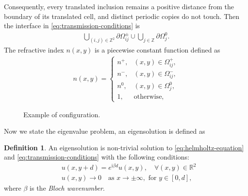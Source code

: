 \documentclass[11pt,fleqn]{article}
\newcommand{\ii}{\mathrm{i}}
\theoremstyle{definition}
\newtheorem{definition}{Definition}
\theoremstyle{remark}
\begin{document}
Consequently, every translated inclusion remains a positive distance from the
boundary of its translated cell, and distinct periodic copies do not touch.
Then the interface in \eqref{eq:transmission-conditions} is \begin{align*}
  \bigcup_{(i,j) \in \mathbb{Z}^2} \partial\Omega^\pm_{ij} \cup
  \bigcup_{j \in \mathbb{Z}} \partial\Omega^0_j.
\end{align*}
The refractive index $n(x, y)$ is a piecewise constant function defined as \begin{align}
  n(x,y) = \begin{cases}
    n^+, & (x,y) \in \Omega^+_{ij},\\
    n^-, & (x,y) \in \Omega^-_{ij},\\
    n^0, & (x,y) \in \Omega^0_j,\\
    1, & \text{otherwise},
  \end{cases}
\end{align}

\begin{figure}[ht]
\centering
{}
\caption{Example of configuration.}
\label{fig:y-periodic-configuration}
\end{figure}

Now we state the eigenvalue problem, an eigensolution is defined as 
\begin{definition}
An eigensolution is non-trivial solution to \eqref{eq:helmholtz-equation} and \eqref{eq:transmission-conditions} with the following conditions:
\begin{align*}
  &u(x, y + d) = e^{\ii\beta d}u(x, y),\quad \forall (x,y) \in \mathbb{R}^2\\
  &u(x,y)\to 0 \quad \text{as } x\to\pm\infty, \text{ for } y\in[0,d],
\end{align*}
where $\beta$ is the \emph{Bloch wavenumber}.
\end{definition}
\end{document}

